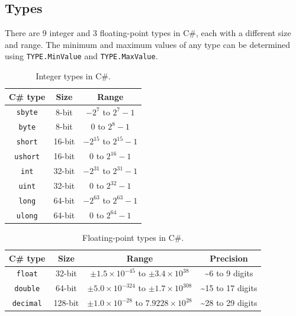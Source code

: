 \documentclass{article}
\begin{document}
\subsection{Types}
There are 9 integer and 3 floating-point types in C\#, each with a different size and range. The minimum and maximum
values of any type can be determined using \lstinline{TYPE.MinValue} and \linebreak \lstinline{TYPE.MaxValue}.
\begin{table}[H]
    \centering
    \begin{tabular}{c c c}
        \toprule
        \textbf{C\# type} & \textbf{Size} & \textbf{Range}                 \\
        \midrule
        \lstinline!sbyte!  & 8-bit         & \(-2^7\) to \(2^7 - 1\)        \\
        \lstinline!byte!   & 8-bit         & \(0\) to \(2^8 - 1\)           \\
        \lstinline!short!  & 16-bit        & \(-2^{15}\) to \(2^{15} - 1\) \\
        \lstinline!ushort! & 16-bit        & \(0\) to \(2^{16} - 1\)       \\
        \lstinline!int!    & 32-bit        & \(-2^{31}\) to \(2^{31} - 1\) \\
        \lstinline!uint!   & 32-bit        & \(0\) to \(2^{32} - 1\)       \\
        \lstinline!long!   & 64-bit        & \(-2^{63}\) to \(2^{63} - 1\) \\
        \lstinline!ulong!  & 64-bit        & \(0\) to \(2^{64} - 1\)       \\
        \bottomrule
    \end{tabular}
    \caption{Integer types in C\#.}
\end{table}
\begin{table}[H]
    \centering
    \begin{tabular}{c c c c}
        \toprule
        \textbf{C\# type}                                                                                 & \textbf{Size}        & \textbf{Range} & \textbf{Precision} \\
        \midrule
        \lstinline!float!   & 32-bit        & \(\pm 1.5 \times 10^{-45}\) to \(\pm 3.4 \times 10^{38}\)   & \sim 6 to 9 digits                                         \\
        \lstinline!double!  & 64-bit        & \(\pm 5.0 \times 10^{-324}\) to \(\pm 1.7 \times 10^{308}\) & \sim 15 to 17 digits                                       \\
        \lstinline!decimal! & 128-bit       & \(\pm 1.0 \times 10^{-28}\) to \(7.9228 \times 10^{28}\)    & \sim 28 to 29 digits                                       \\
        \bottomrule
    \end{tabular}
    \caption{Floating-point types in C\#.}
\end{table}
\end{document}
